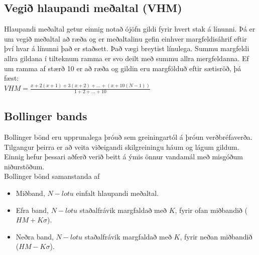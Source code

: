 \documentclass[11pt]{article}
\begin{document}
\subsection{Vegið hlaupandi meðaltal (VHM)}
Hlaupandi meðaltal getur einnig notað ójöfn gildi fyrir hvert stak á línunni.
Þá er um vegið meðaltal að ræða og er meðaltalinu gefin einhver margfeldisáhrif eftir því hvar á línunni það er staðsett. 
Það vægi breytist línulega. Summu margfeldi allra gildana í tilteknum ramma er svo deilt með summu allra mergfeldanna. 
Ef um ramma af stærð 10 er að ræða og gildin eru margfölduð eftir sætisröð, þá fæst: \\
$VHM = \frac{x+2(x+1)+3(x+2)+\dots+(x+10(N-1))}{1+2+\dots+10}$
\subsection{Bollinger bands}
\label{sec:third}
Bollinger bönd eru upprunalega þróuð sem greiningartól á þróun verðbréfaverða. 
Tilgangur þeirra er að veita viðeigandi skilgreiningu háum og lágum gildum. Einnig hefur þessari aðferð verið beitt á ýmis önnur
vandamál með misgóðum niðurstöðum. \\
Bollinger bönd samanstanda af
\begin{itemize}
  \item Miðband, $N-lotu$ einfalt hlaupandi meðaltal.
  \item Efra band, $N-lotu$ staðalfrávik margfaldað með $K$, fyrir ofan miðbandið ($HM + K\sigma$).
  \item Neðra band, $N-lotu$ staðalfrávik margfaldað með $K$, fyrir neðan miðbandið ($HM - K\sigma$).%
\end{itemize}
\end{document}

